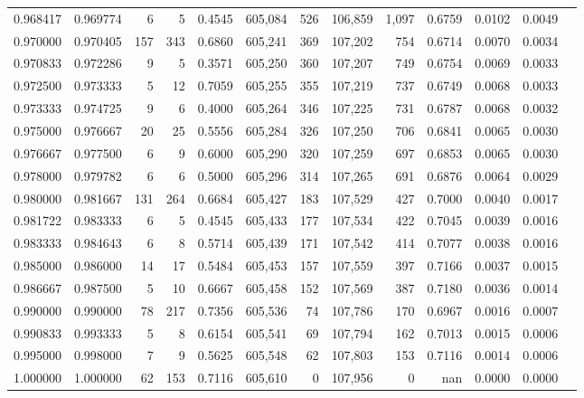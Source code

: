 \begin{tabular}{rrrrrrrrrrrrr}
0.968417 & 0.969774 &     6 &   5 &                                     0.4545 & 605,084 &     526 & 106,859 &   1,097 & 0.6759 & 0.0102 & 0.0049 \\
0.970000 & 0.970405 &   157 & 343 &                                     0.6860 & 605,241 &     369 & 107,202 &     754 & 0.6714 & 0.0070 & 0.0034 \\
0.970833 & 0.972286 &     9 &   5 &                                     0.3571 & 605,250 &     360 & 107,207 &     749 & 0.6754 & 0.0069 & 0.0033 \\
0.972500 & 0.973333 &     5 &  12 &                                     0.7059 & 605,255 &     355 & 107,219 &     737 & 0.6749 & 0.0068 & 0.0033 \\
0.973333 & 0.974725 &     9 &   6 &                                     0.4000 & 605,264 &     346 & 107,225 &     731 & 0.6787 & 0.0068 & 0.0032 \\
0.975000 & 0.976667 &    20 &  25 &                                     0.5556 & 605,284 &     326 & 107,250 &     706 & 0.6841 & 0.0065 & 0.0030 \\
0.976667 & 0.977500 &     6 &   9 &                                     0.6000 & 605,290 &     320 & 107,259 &     697 & 0.6853 & 0.0065 & 0.0030 \\
0.978000 & 0.979782 &     6 &   6 &                                     0.5000 & 605,296 &     314 & 107,265 &     691 & 0.6876 & 0.0064 & 0.0029 \\
0.980000 & 0.981667 &   131 & 264 &                                     0.6684 & 605,427 &     183 & 107,529 &     427 & 0.7000 & 0.0040 & 0.0017 \\
0.981722 & 0.983333 &     6 &   5 &                                     0.4545 & 605,433 &     177 & 107,534 &     422 & 0.7045 & 0.0039 & 0.0016 \\
0.983333 & 0.984643 &     6 &   8 &                                     0.5714 & 605,439 &     171 & 107,542 &     414 & 0.7077 & 0.0038 & 0.0016 \\
0.985000 & 0.986000 &    14 &  17 &                                     0.5484 & 605,453 &     157 & 107,559 &     397 & 0.7166 & 0.0037 & 0.0015 \\
0.986667 & 0.987500 &     5 &  10 &                                     0.6667 & 605,458 &     152 & 107,569 &     387 & 0.7180 & 0.0036 & 0.0014 \\
0.990000 & 0.990000 &    78 & 217 &                                     0.7356 & 605,536 &      74 & 107,786 &     170 & 0.6967 & 0.0016 & 0.0007 \\
0.990833 & 0.993333 &     5 &   8 &                                     0.6154 & 605,541 &      69 & 107,794 &     162 & 0.7013 & 0.0015 & 0.0006 \\
0.995000 & 0.998000 &     7 &   9 &                                     0.5625 & 605,548 &      62 & 107,803 &     153 & 0.7116 & 0.0014 & 0.0006 \\
1.000000 & 1.000000 &    62 & 153 &                                     0.7116 & 605,610 &       0 & 107,956 &       0 &    nan & 0.0000 & 0.0000 \\
\bottomrule
\end{tabular}
